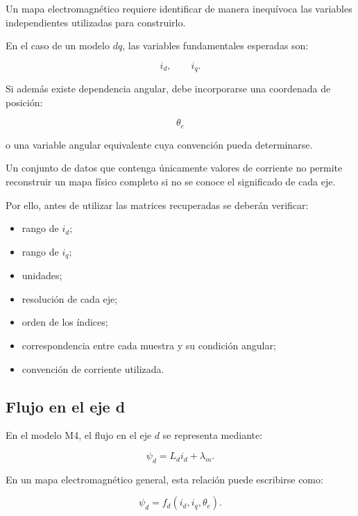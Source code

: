 Un mapa electromagnético requiere identificar de manera inequívoca las variables independientes utilizadas para construirlo.

En el caso de un modelo $dq$, las variables fundamentales esperadas son:

\begin{equation}
i_d,\qquad i_q.
\end{equation}

Si además existe dependencia angular, debe incorporarse una coordenada de posición:

\begin{equation}
\theta_e
\end{equation}

o una variable angular equivalente cuya convención pueda determinarse.

Un conjunto de datos que contenga únicamente valores de corriente no permite reconstruir un mapa físico completo si no se conoce el significado de cada eje.

Por ello, antes de utilizar las matrices recuperadas se deberán verificar:

\begin{itemize}
\item rango de $i_d$;
\item rango de $i_q$;
\item unidades;
\item resolución de cada eje;
\item orden de los índices;
\item correspondencia entre cada muestra y su condición angular;
\item convención de corriente utilizada.
\end{itemize}

\subsection{Flujo en el eje d}

En el modelo M4, el flujo en el eje $d$ se representa mediante:

\begin{equation}
\psi_d=L_di_d+\lambda_m.
\end{equation}

En un mapa electromagnético general, esta relación puede escribirse como:

\begin{equation}
\psi_d=f_d(i_d,i_q,\theta_e).
\end{equation}

